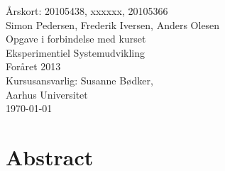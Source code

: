 \documentclass[12pt,a4paper,twoside,danish,article]{memoir}
\begin{document}
\frontmatter
\begin{titlingpage}
  \begin{center}
    \mbox{}\vfill
    \vspace{3cm}
    \Large{Årskort: 20105438, xxxxxx, 20105366}\\
    \Large{Simon Pedersen, Frederik Iversen, Anders Olesen}\\
    \vspace{10cm}
    Opgave i forbindelse med kurset\\ Eksperimentiel Systemudvikling\\
    Foråret 2013\\
    \vspace{1cm}
    Kursusansvarlig: Susanne Bødker,\\Aarhus Universitet\\
    \today
  \end{center}
  \clearpage
  \tableofcontents*
\end{titlingpage}

\mainmatter
\setlength{\parskip}{6pt plus 1pt minus 1pt}
\setlength{\parindent}{0cm}
\renewcommand{\baselinestretch}{1.6}\normalsize %

\renewcommand{\chaptermark}[1]{\markboth{\thechapter.
    #1}{\thechapter. #1}} %
\renewcommand{\bibmark}{\markboth{\bibname}{\bibname}} %
\renewcommand{\tocmark}{\markboth{\contentsname}{\contentsname}}


\chapter{Abstract}









\backmatter
\renewcommand{\baselinestretch}{1}\normalsize %

\end{document}
